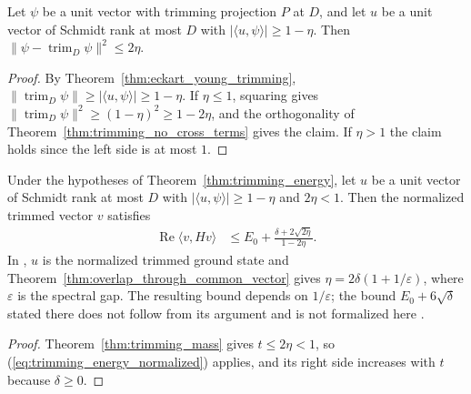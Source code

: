 \begin{theorem}
    \label{thm:trimming_mass}
    \leanok
    Let $\psi$ be a unit vector with trimming projection $P$ at $D$, and let
    $u$ be a unit vector of Schmidt rank at most $D$ with
    $|\langle u,\psi\rangle|\ge1-\eta$. Then
    $\|\psi-\operatorname{trim}_D\psi\|^2\le2\eta$.
\end{theorem}

\begin{proof}
    \leanok
    By Theorem~\ref{thm:eckart_young_trimming},
    $\|\operatorname{trim}_D\psi\|\ge|\langle u,\psi\rangle|\ge1-\eta$. If
    $\eta\le1$, squaring gives $\|\operatorname{trim}_D\psi\|^2\ge
        (1-\eta)^2\ge1-2\eta$, and the orthogonality of
    Theorem~\ref{thm:trimming_no_cross_terms} gives the claim. If $\eta>1$
    the claim holds since the left side is at most $1$.
\end{proof}

\begin{theorem}
    \label{thm:trimming_energy_overlap}
    \leanok
    Under the hypotheses of Theorem~\ref{thm:trimming_energy}, let $u$ be a
    unit vector of Schmidt rank at most $D$ with
    $|\langle u,\psi\rangle|\ge1-\eta$ and $2\eta<1$. Then the normalized
    trimmed vector $v$ satisfies
    \begin{align}
        \operatorname{Re}\langle v,Hv\rangle & \le
        E_0+\frac{\delta+2\sqrt{2\eta}}{1-2\eta}.
        \label{eq:trimming_energy_overlap}
    \end{align}
    In \cite[Lemma~l:2]{Landau2013PolynomialTime}, $u$ is the normalized
    trimmed ground state and Theorem~\ref{thm:overlap_through_common_vector}
    gives $\eta=2\delta(1+1/\varepsilon)$, where $\varepsilon$ is the
    spectral gap. The resulting bound depends on $1/\varepsilon$; the bound
    $E_0+6\sqrt\delta$ stated there does not follow from its argument and is
    not formalized here \cite{gap:lvv13_trimming_energy}.
\end{theorem}

\begin{proof}
    \leanok
    Theorem~\ref{thm:trimming_mass} gives $t\le2\eta<1$, so
    (\ref{eq:trimming_energy_normalized}) applies, and its right side
    increases with $t$ because $\delta\ge0$.
\end{proof}


